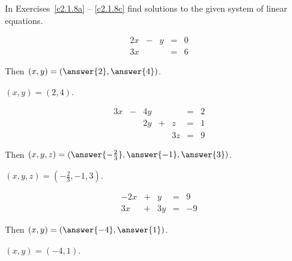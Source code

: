 \documentclass{ximera}
\begin{document}
\noindent In Exercises~\ref{c2.1.8a} -- \ref{c2.1.8c} find solutions
to the given system of linear equations.
\begin{exercise} \label{c2.1.8a}
\[
\begin{array}{rcrcr}
 2x & - & y & = & 0 \\
 3x &   &   & = & 6 \end{array}
\]
\begin{prompt}
  Then $(x,y) = (\answer{2},\answer{4})$.
\end{prompt}

\begin{solution}
$(x,y) = (2,4)$.

\end{solution}
\end{exercise}
\begin{exercise} \label{c2.1.8b}
\[
\begin{array}{rcrcrcr}
 3x & - & 4y &   &    & = & 2\\
    &   & 2y & + & z  & = & 1\\
    &   &    &   & 3z & = & 9 \end{array}
\]
\begin{prompt}
  Then  $(x,y,z) = (\answer{-\frac{2}{3}}, \answer{-1}, \answer{3})$.
\end{prompt}

\begin{solution}
$(x,y,z) = (-\frac{2}{3}, -1, 3)$.

\end{solution}
\end{exercise}
\begin{exercise} \label{c2.1.8c}
\[
\begin{array}{rcrcr}
 -2x & + &  y & = &  9 \\
  3x & + & 3y & = & -9 \end{array}
\]
\begin{prompt}
  Then $(x,y) = (\answer{-4},\answer{1})$.
\end{prompt}

\begin{solution}
$(x,y) = (-4,1)$.

\end{solution}
\end{exercise}
\end{document}

